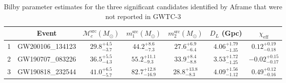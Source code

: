 \begin{table}[ht]
\centering
\caption{Bilby parameter estimates for the three significant candidates identified by Aframe that were not reported in GWTC-3}
\label{o3cat_tab:aframe-pe}
\small\begin{tabular}{!{\vrule width 1pt}lcccccc!{\vrule width 1pt}}
\toprule[1pt]
& Event & $\mathcal{M}_c^\mathrm{src} (M_\odot)$ & ${m}_1^\mathrm{src} (M_\odot)$ & ${m}_2^\mathrm{src} (M_\odot)$ & $D_L$ (Gpc) & $\chi_\mathrm{eff}$ \\
 & GW200106\_134123 & ${29.8}_{-3.7}^{+4.5}$ & ${44.2}_{-7.3}^{+8.6}$ & ${27.6}_{-6.4}^{+6.9}$ & ${4.06}_{-1.35}^{+1.79}$ & ${0.12}_{-0.18}^{+0.19}$ \\
2 & GW190707\_083226 & ${36.5}_{-4.3}^{+5.5}$ & ${55.2}_{-9.3}^{+11.1}$ & ${33.9}_{-8.8}^{+8.4}$ & ${3.53}_{-1.25}^{+1.72}$ & ${-0.02}_{-0.17}^{+0.15}$ \\
3 & GW190818\_232544 & ${41.0}_{-5.7}^{+6.5}$ & ${82.7}_{-16.9}^{+12.8}$ & ${28.8}_{-8.3}^{+13.8}$ & ${4.09}_{-1.12}^{+1.56}$ & ${0.49}_{-0.16}^{+0.12}$ \\
\bottomrule[1pt]
\end{tabular}
\end{table}








